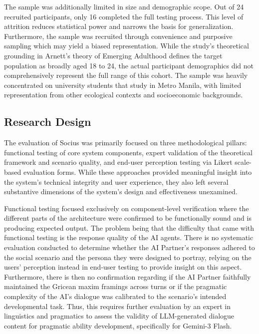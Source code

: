 The sample was additionally limited in size and demographic scope. Out of 24
recruited participants, only 16 completed the full testing process. This level of attrition reduces statistical power and
narrows the basis for generalization. Furthermore, the sample was recruited through
convenience and purposive sampling which may yield a biased representation.
While the study's theoretical grounding in Arnett's theory of Emerging Adulthood
defines the target population as broadly aged 18 to 24, the actual participant
demographics did not comprehensively represent the full range of this cohort. The sample 
was heavily concentrated on university students that study in Metro Manila, with limited representation from
other ecological contexts and socioeconomic backgrounds.

\subsection{Research Design}\label{subsec:design-limitations}

The evaluation of Socius was primarily focused on three methodological pillars:
functional testing of core system components, expert validation of the theoretical
framework and scenario quality, and end-user perception testing via Likert scale-based
evaluation forms. While these approaches provided meaningful insight into the
system's technical integrity and user experience, they also left several
substantive dimensions of the system's design and effectiveness unexamined.

Functional testing focused exclusively on component-level verification where the different
parts of the architecture were confirmed to be functionally sound and is producing expected output. The problem being 
that the difficulty that came with functional testing is the response quality of the AI agents. There is no systematic
evaluation conducted to determine whether the AI Partner's responses adhered to the social scenario and the persona they were 
designed to portray, relying on the users' perception instead in end-user testing to provide insight on this aspect.
Furthermore, there is then no confirmation regarding if the AI Partner faithfully maintained the Gricean maxim framings
across turns or if the pragmatic complexity of the AI's dialogue was calibrated to the scenario's intended developmental task.
Thus, this requires further evaluation by an expert in linguistics and pragmatics to assess the validity of LLM-generated dialogue content
for pragmatic ability development, specifically for Gemini-3 Flash.

